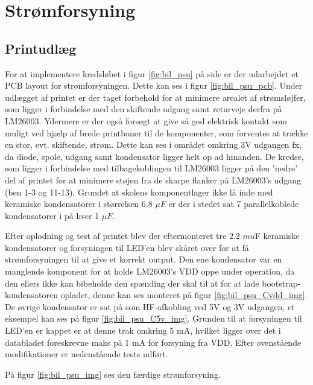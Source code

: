 \section{Strømforsyning} %
\subsection{Printudlæg}

For at implementere kredsløbet i figur \ref{fig:bil_psu} på side \pageref{fig:bil_psu} er der udarbejdet et PCB layout for strømforsyningen.
Dette kan ses i figur \ref{fig:bil_psu_pcb}. 
Under udlægget af printet er der taget forbehold for at minimere arealet af strømsløjfer, som ligger i forbindelse med den skiftende udgang samt returveje derfra på LM26003. Ydermere er der også forsøgt at give så god elektrisk kontakt som muligt ved hjælp af brede printbaner til de komponenter, som forventes at trække en stor, evt. skiftende, strøm.
Dette kan ses i området omkring 3V udgangen fx, da diode, spole, udgang samt kondensator ligger helt op ad hinanden. 
De kredse, som ligger i forbindelse med tilbagekoblingen til LM26003 ligger på den 'nedre' del af printet for at minimere støjen fra de skarpe flanker på LM26003's udgang (ben 1-3 og 11-13).
Grundet at skolens komponentlager ikke lå inde med keramiske kondensatorer i størrelsen 6.8 $\mu F$ er der i stedet sat 7 parallelkoblede kondensatorer i på hver 1 $\mu F$.

Efter oplodning og test af printet blev der eftermonteret tre 2.2 $mu$F keramiske kondensatorer og forsyningen til LED'en blev skåret over for at få strømforsyningen til at give et korrekt output.
Den ene kondensator var en manglende komponent for at holde LM26003's VDD oppe under operation, da den ellers ikke kan bibeholde den spænding der skal til at for at lade bootstrap-kondensatoren opladet, denne kan ses monteret på figur \ref{fig:bil_psu_Cvdd_img}.
De øvrige kondensator er sat på som HF-afkobling ved 5V og 3V udgangen, et eksempel kan ses på figur \ref{fig:bil_psu_C5v_img}.
Grunden til at forsyningen til LED'en er kappet er at denne trak omkring 5 mA, hvilket ligger over det i databladet foreskrevne maks på 1 mA for forsyning fra VDD.
Efter ovenstående modifikationer er nedenstående tests udført.

På figur \ref{fig:bil_psu_img} ses den færdige strømforsyning.

